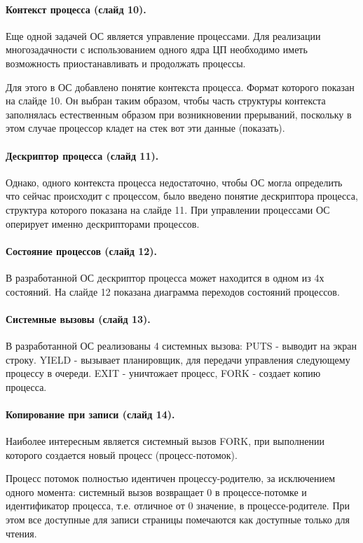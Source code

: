 \documentclass[12pt]{article}
\begin{document}
\paragraph{Контекст процесса (слайд 10).}
Еще одной задачей ОС является управление процессами. Для реализации многозадачности с
использованием одного ядра ЦП необходимо иметь возможность приостанавливать и продолжать процессы.

Для этого в ОС добавлено понятие контекста процесса. Формат которого показан на слайде 10.
Он выбран таким образом, чтобы часть структуры контекста заполнялась естественным образом при
возникновении прерываний, поскольку в этом случае процессор кладет на стек вот эти данные (показать).

\paragraph{Дескриптор процесса (слайд 11).}
Однако, одного контекста процесса недостаточно, чтобы ОС могла определить что сейчас происходит
с процессом, было введено понятие дескриптора процесса, структура которого показана на слайде 11.
При управлении процессами ОС оперирует именно дескрипторами процессов.

\paragraph{Состояние процессов (слайд 12).}
В разработанной ОС дескриптор процесса может находится в одном из 4х состояний.
На слайде 12 показана диаграмма переходов состояний процессов.


\paragraph{Системные вызовы (слайд 13).}
В разработанной ОС реализованы 4 системных вызова: PUTS - выводит на экран строку.
YIELD - вызывает планировщик, для передачи управления следующему процессу в очереди.
EXIT - уничтожает процесс, FORK - создает копию процесса.


\paragraph{Копирование при записи (слайд 14).}
Наиболее интересным является системный вызов FORK, при выполнении которого создается новый процесс (процесс-потомок).

Процесс потомок полностью идентичен процессу-родителю, за исключением одного момента: системный вызов
возвращает 0 в процессе-потомке и идентификатор процесса, т.е. отличное от 0 значение, в процессе-родителе.
При этом все доступные для записи страницы помечаются как доступные только для чтения.
\end{document}
